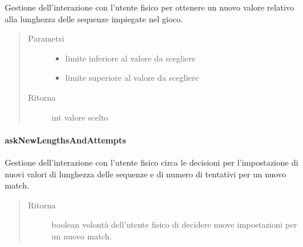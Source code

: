 \documentclass[letterpaper,10pt,italian,openany,oneside]{sphinxmanual}
\begin{document}
\begin{fulllineitems}
\label{\detokenize{test/it/unicam/cs/pa/mastermind/ui/StartView:it.unicam.cs.pa.mastermind.ui.StartView.askNewLength(int, int)}}
Gestione dell’interazione con l’utente fisico per ottenere un nuovo valore relativo alla lunghezza delle sequenze impiegate nel gioco.
\begin{quote}\begin{description}
\item[{Parametri}] \leavevmode\begin{itemize}
\item {} 
 \textendash{} limite inferiore al valore da scegliere

\item {} 
 \textendash{} limite superiore al valore da scegliere

\end{itemize}

\item[{Ritorna}] \leavevmode
int valore scelto

\end{description}\end{quote}

\end{fulllineitems}



\paragraph{askNewLengthsAndAttempts}
\label{\detokenize{test/it/unicam/cs/pa/mastermind/ui/StartView:asknewlengthsandattempts}}

\begin{fulllineitems}
\label{\detokenize{test/it/unicam/cs/pa/mastermind/ui/StartView:it.unicam.cs.pa.mastermind.ui.StartView.askNewLengthsAndAttempts()}}
Gestione dell’interazione con l’utente fisico circa le decisioni per l’impostazione di nuovi valori di lunghezza delle sequenze e di numero di tentativi per un nuovo match.
\begin{quote}\begin{description}
\item[{Ritorna}] \leavevmode
boolean volontà dell’utente fisico di decidere nuove impostazioni per un nuovo match.

\end{description}\end{quote}

\end{fulllineitems}
\end{document}
